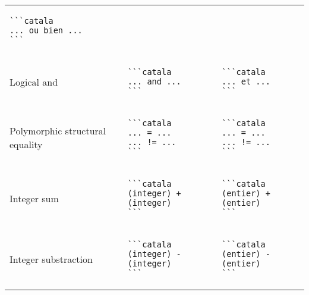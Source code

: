 \documentclass[a3paper,landscape]{article}
\begin{document}
\begin{multicols*}{2}
\begin{center}
\begin{tabular}{p{}p{}p{}}
\begin{verbatim}
```catala
... ou bien ...
```
\end{verbatim}
\vspace*{-1.75em}
\\
Logical and&
\vspace*{-1.75em}
\begin{verbatim}
```catala
... and ...
```
\end{verbatim}
\vspace*{-1.75em}
&
\vspace*{-1.75em}
\begin{verbatim}
```catala
... et ...
```
\end{verbatim}
\vspace*{-1.75em}
\\
Polymorphic structural equality&
\vspace*{-1.75em}
\begin{verbatim}
```catala
... = ...
... != ...
```
\end{verbatim}
\vspace*{-1.75em}
&
\vspace*{-1.75em}
\begin{verbatim}
```catala
... = ...
... != ...
```
\end{verbatim}
\vspace*{-1.75em}
\\
Integer sum&
\vspace*{-1.75em}
\begin{verbatim}
```catala
(integer) + (integer)
```
\end{verbatim}
\vspace*{-1.75em}
&
\vspace*{-1.75em}
\begin{verbatim}
```catala
(entier) + (entier)
```
\end{verbatim}
\vspace*{-1.75em}
\\
Integer substraction&
\vspace*{-1.75em}
\begin{verbatim}
```catala
(integer) - (integer)
```
\end{verbatim}
\vspace*{-1.75em}
&
\vspace*{-1.75em}
\begin{verbatim}
```catala
(entier) - (entier)
```
\end{verbatim}
\vspace*{-1.75em}

\end{tabular}
\end{center}
\end{multicols*}
\end{document}
